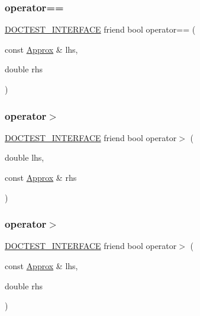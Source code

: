 \subsubsection{\texorpdfstring{operator==}{operator==}\hspace{0.1cm}{\footnotesize\ttfamily [2/2]}}
{\footnotesize\ttfamily \hyperlink{doctest_8h_a9c16ffc635ec47f07797d21ede26b1a5}{D\+O\+C\+T\+E\+S\+T\+\_\+\+I\+N\+T\+E\+R\+F\+A\+CE} friend bool operator== (\begin{DoxyParamCaption}\item[{const \hyperlink{classdoctest_1_1Approx}{Approx} \&}]{lhs,  }\item[{double}]{rhs }\end{DoxyParamCaption})\hspace{0.3cm}{\ttfamily [friend]}}

\mbox{\label{classdoctest_1_1Approx_a97a6e92b9c9dacc0adb2f76f9faf2924}} 
\subsubsection{\texorpdfstring{operator$>$}{operator>}\hspace{0.1cm}{\footnotesize\ttfamily [1/2]}}
{\footnotesize\ttfamily \hyperlink{doctest_8h_a9c16ffc635ec47f07797d21ede26b1a5}{D\+O\+C\+T\+E\+S\+T\+\_\+\+I\+N\+T\+E\+R\+F\+A\+CE} friend bool operator$>$ (\begin{DoxyParamCaption}\item[{double}]{lhs,  }\item[{const \hyperlink{classdoctest_1_1Approx}{Approx} \&}]{rhs }\end{DoxyParamCaption})\hspace{0.3cm}{\ttfamily [friend]}}

\mbox{\label{classdoctest_1_1Approx_a12a93e1726180db4091cb2e3b8ba5e30}} 
\subsubsection{\texorpdfstring{operator$>$}{operator>}\hspace{0.1cm}{\footnotesize\ttfamily [2/2]}}
{\footnotesize\ttfamily \hyperlink{doctest_8h_a9c16ffc635ec47f07797d21ede26b1a5}{D\+O\+C\+T\+E\+S\+T\+\_\+\+I\+N\+T\+E\+R\+F\+A\+CE} friend bool operator$>$ (\begin{DoxyParamCaption}\item[{const \hyperlink{classdoctest_1_1Approx}{Approx} \&}]{lhs,  }\item[{double}]{rhs }\end{DoxyParamCaption})\hspace{0.3cm}{\ttfamily [friend]}}

